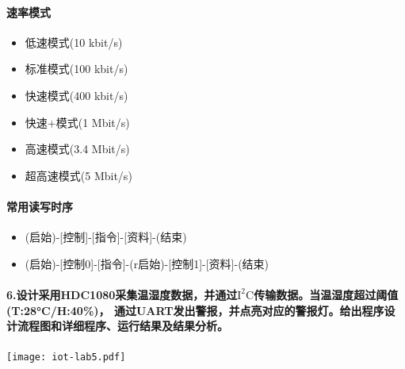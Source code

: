 \documentclass[a4paper]{ctexart}
\begin{document}
    \paragraph*{速率模式}
    \begin{itemize}
      \item 低速模式(10 kbit/s)
      \item 标准模式(100 kbit/s)
      \item 快速模式(400 kbit/s)
      \item 快速+模式(1 Mbit/s)
      \item 高速模式(3.4 Mbit/s)
      \item 超高速模式(5 Mbit/s)
    \end{itemize}

    \paragraph*{常用读写时序}
    \begin{itemize}
      \item (启始)-[控制]-[指令]-[资料]-(结束)
      \item (启始)-[控制0]-[指令]-(r启始)-[控制1]-[资料]-(结束)
    \end{itemize}

    \paragraph{6.设计采用HDC1080采集温湿度数据，并通过$\mathrm{I^2C}$传输数据。当温湿度超过阈值(T:28°C/H:40\%)，
    通过UART发出警报，并点亮对应的警报灯。给出程序设计流程图和详细程序、运行结果及结果分析。\\}
    \texttt{[image: iot-lab5.pdf]}
    
\end{document}
